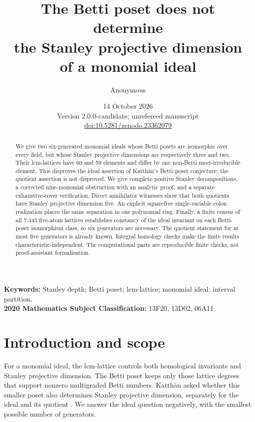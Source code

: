 \documentclass[11pt,a4paper]{article}
\title{\textbf{The Betti poset does not determine\\the Stanley projective dimension\\of a monomial ideal}}
\author{Anonymous}
\date{14 October 2026\\\small Version 2.0.0-candidate; unrefereed manuscript\\\small\href{https://doi.org/10.5281/zenodo.23362079}{doi:10.5281/zenodo.23362079}}
\theoremstyle{remark}\newtheorem{remark}[theorem]{Remark}
\begin{document}
\maketitle
\begin{abstract}
We give two six-generated monomial ideals whose Betti posets are isomorphic over every field, but whose Stanley projective dimensions are respectively three and two. Their lcm-lattices have 60 and 59 elements and differ by one non-Betti meet-irreducible element. This disproves the ideal assertion of Katth\"an's Betti-poset conjecture; the quotient assertion is not disproved. We give complete positive Stanley decompositions, a corrected nine-monomial obstruction with an analytic proof, and a separate exhaustive-cover verification. Direct annihilator witnesses show that both quotients have Stanley projective dimension five. An explicit squarefree single-variable colon realization places the same separation in one polynomial ring. Finally, a finite census of all 7,443 five-atom lattices establishes constancy of the ideal invariant on each Betti-poset isomorphism class, so six generators are necessary. The quotient statement for at most five generators is already known. Integral homology checks make the finite results characteristic-independent. The computational parts are reproducible finite checks, not proof-assistant formalisation.
\end{abstract}
\noindent\textbf{Keywords:} Stanley depth; Betti poset; lcm-lattice; monomial ideal; interval partition.\\
\textbf{2020 Mathematics Subject Classification:} 13F20, 13D02, 06A11.

\section{Introduction and scope}
For a monomial ideal, the lcm-lattice controls both homological invariants and Stanley projective dimension. The Betti poset keeps only those lattice degrees that support nonzero multigraded Betti numbers. Katth\"an asked whether this smaller poset also determines Stanley projective dimension, separately for the ideal and its quotient \cite{Katthan2016}. We answer the ideal question negatively, with the smallest possible number of generators.
\end{document}
